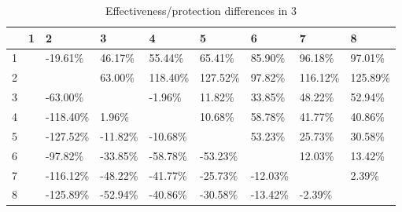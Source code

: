 \begin{table}[ht]
\centering
\begin{tabular}{rllllllll}
  \hline
 & 1 & 2 & 3 & 4 & 5 & 6 & 7 & 8 \\ 
  \hline
1 &  & -19.61\% & 46.17\% & 55.44\% & 65.41\% & 85.90\% & 96.18\% & 97.01\% \\ 
  2 &  &  & 63.00\% & 118.40\% & 127.52\% & 97.82\% & 116.12\% & 125.89\% \\ 
  3 &  & -63.00\% &  & -1.96\% & 11.82\% & 33.85\% & 48.22\% & 52.94\% \\ 
  4 &  & -118.40\% & 1.96\% &  & 10.68\% & 58.78\% & 41.77\% & 40.86\% \\ 
  5 &  & -127.52\% & -11.82\% & -10.68\% &  & 53.23\% & 25.73\% & 30.58\% \\ 
  6 &  & -97.82\% & -33.85\% & -58.78\% & -53.23\% &  & 12.03\% & 13.42\% \\ 
  7 &  & -116.12\% & -48.22\% & -41.77\% & -25.73\% & -12.03\% &  & 2.39\% \\ 
  8 &  & -125.89\% & -52.94\% & -40.86\% & -30.58\% & -13.42\% & -2.39\% &  \\ 
   \hline
\end{tabular}
\caption{Effectiveness/protection differences in  3} 
\end{table}
